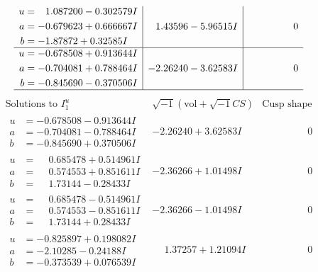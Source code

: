 \documentclass[1p]{elsarticle_modified}
\theoremstyle{definition}
\newcommand{\I}{\sqrt{-1}}
\begin{document}
$$\begin{array}{c|c|c}
\begin{aligned}
u &= \phantom{-}1.087200 - 0.302579 I \\
a &= -0.679623 + 0.666667 I \\
b &= -1.87872 + 0.32585 I\end{aligned}
 & \phantom{-}1.43596 - 5.96515 I & \phantom{-0.000000 } 0 \\ \hline\begin{aligned}
u &= -0.678508 + 0.913644 I \\
a &= -0.704081 + 0.788464 I \\
b &= -0.845690 - 0.370506 I\end{aligned}
 & -2.26240 - 3.62583 I & \phantom{-0.000000 } 0\\
 \hline 
 \end{array}$$\newpage$$\begin{array}{c|c|c}  
\text{Solutions to }I^u_{1}& \I (\text{vol} + \sqrt{-1}CS) & \text{Cusp shape}\\
 \hline 
\begin{aligned}
u &= -0.678508 - 0.913644 I \\
a &= -0.704081 - 0.788464 I \\
b &= -0.845690 + 0.370506 I\end{aligned}
 & -2.26240 + 3.62583 I & \phantom{-0.000000 } 0 \\ \hline\begin{aligned}
u &= \phantom{-}0.685478 + 0.514961 I \\
a &= \phantom{-}0.574553 + 0.851611 I \\
b &= \phantom{-}1.73144 - 0.28433 I\end{aligned}
 & -2.36266 + 1.01498 I & \phantom{-0.000000 } 0 \\ \hline\begin{aligned}
u &= \phantom{-}0.685478 - 0.514961 I \\
a &= \phantom{-}0.574553 - 0.851611 I \\
b &= \phantom{-}1.73144 + 0.28433 I\end{aligned}
 & -2.36266 - 1.01498 I & \phantom{-0.000000 } 0 \\ \hline\begin{aligned}
u &= -0.825897 + 0.198082 I \\
a &= -2.10285 - 0.24188 I \\
b &= -0.373539 + 0.076539 I\end{aligned}
 & \phantom{-}1.37257 + 1.21094 I & \phantom{-0.000000 } 0 \\ \hline\begin{aligned}

\end{aligned}
\end{array}$$
\end{document}
